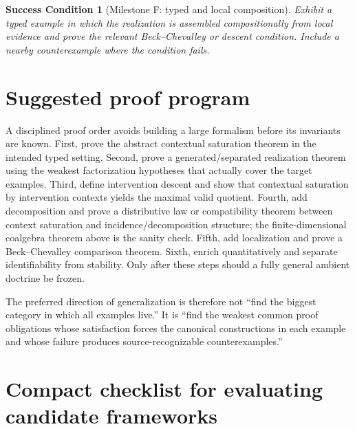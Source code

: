 \documentclass[11pt]{article}
\newtheorem{condition}[theorem]{Success Condition}
\theoremstyle{definition}
\theoremstyle{remark}
\begin{document}
\begin{condition}[Milestone F: typed and local composition]
Exhibit a typed example in which the realization is assembled compositionally from local evidence and prove the relevant Beck--Chevalley or descent condition. Include a nearby counterexample where the condition fails.
\end{condition}

\section{Suggested proof program}

A disciplined proof order avoids building a large formalism before its invariants are known. First, prove the abstract contextual saturation theorem in the intended typed setting. Second, prove a generated/separated realization theorem using the weakest factorization hypotheses that actually cover the target examples. Third, define intervention descent and show that contextual saturation by intervention contexts yields the maximal valid quotient. Fourth, add decomposition and prove a distributive law or compatibility theorem between context saturation and incidence/decomposition structure; the finite-dimensional coalgebra theorem above is the sanity check. Fifth, add localization and prove a Beck--Chevalley comparison theorem. Sixth, enrich quantitatively and separate identifiability from stability. Only after these steps should a fully general ambient doctrine be frozen.

The preferred direction of generalization is therefore not ``find the biggest category in which all examples live.'' It is ``find the weakest common proof obligations whose satisfaction forces the canonical constructions in each example and whose failure produces source-recognizable counterexamples.''

\section{Compact checklist for evaluating candidate frameworks}
\end{document}
